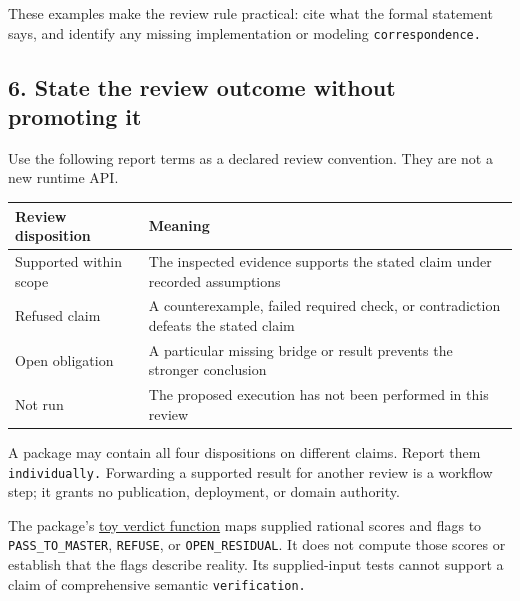 \documentclass[
  11pt,
]{article}
\newcommand{\passthrough}[1]{#1}
\begin{document}
These examples make the review rule practical: cite what the formal
statement says, and identify any missing implementation or modeling
\nolinkurl{correspondence.}

\subsection{6. State the review outcome without promoting
it}\label{state-the-review-outcome-without-promoting-it}

Use the following report terms as a declared review convention. They are
not a new runtime API.

\begin{longtable}[]{@{}
  >{\raggedright\arraybackslash}p{}
  >{\raggedright\arraybackslash}p{}@{}}
\toprule\noalign{}
\begin{minipage}[b]{\linewidth}\raggedright
Review disposition
\end{minipage} & \begin{minipage}[b]{\linewidth}\raggedright
Meaning
\end{minipage} \\
\midrule\noalign{}
\endhead
\bottomrule\noalign{}
\endlastfoot
Supported within scope & The inspected evidence supports the stated
claim under recorded assumptions \\
Refused claim & A counterexample, failed required check, or
contradiction defeats the stated claim \\
Open obligation & A particular missing bridge or result prevents the
stronger conclusion \\
Not run & The proposed execution has not been performed in this
review \\
\end{longtable}

A package may contain all four dispositions on different claims. Report
them \nolinkurl{individually.} Forwarding a supported result for another
review is a workflow step; it grants no publication, deployment, or
domain authority.

The package's \href{code/tests/test_009_adversarial_reality_gate.py}{toy
verdict function} maps supplied rational scores and flags to
\nolinkurl{PASS_TO_MASTER}, \passthrough{\lstinline!REFUSE!}, or
\nolinkurl{OPEN_RESIDUAL}. It does not compute those scores or establish
that the flags describe reality. Its supplied-input tests cannot support
a claim of comprehensive semantic \nolinkurl{verification.}
\end{document}
